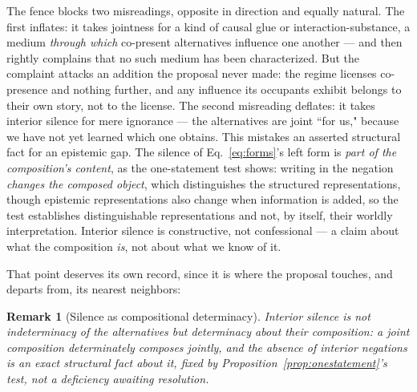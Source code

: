 \documentclass[11pt]{article}
\newtheorem{remark}{Remark}
\begin{document}
The fence blocks two misreadings, opposite in direction and equally natural. The first inflates: it takes jointness for a kind of causal glue or interaction-substance, a medium \emph{through which} co-present alternatives influence one another --- and then rightly complains that no such medium has been characterized. But the complaint attacks an addition the proposal never made: the regime licenses co-presence and nothing further, and any influence its occupants exhibit belongs to their own story, not to the license. The second misreading deflates: it takes interior silence for mere ignorance --- the alternatives are joint ``for us," because we have not yet learned which one obtains. This mistakes an asserted structural fact for an epistemic gap. The silence of Eq.~\eqref{eq:forms}'s left form is \emph{part of the composition's content}, as the one-statement test shows: writing in the negation \emph{changes the composed object}, which distinguishes the structured representations, though epistemic representations also change when information is added, so the test establishes distinguishable representations and not, by itself, their worldly interpretation. Interior silence is constructive, not confessional --- a claim about what the composition \emph{is}, not about what we know of it.

That point deserves its own record, since it is where the proposal touches, and departs from, its nearest neighbors:
\begin{remark}[Silence as compositional determinacy]\label{prop:silence}
Interior silence is not indeterminacy \emph{of} the alternatives but determinacy \emph{about} their composition: a joint composition determinately composes jointly, and the absence of interior negations is an exact structural fact about it, fixed by Proposition~\ref{prop:onestatement}'s test, not a deficiency awaiting resolution.
\end{remark}
\end{document}
